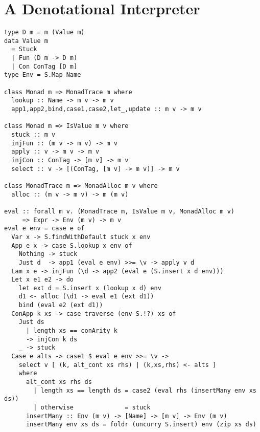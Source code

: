 \section{A Denotational Interpreter}
\label{sec:interp}

\lstset{language=Haskell,style=hsyl}

\begin{lstlisting}
type D m = m (Value m)
data Value m
  = Stuck
  | Fun (D m -> D m)
  | Con ConTag [D m]
type Env = S.Map Name

class Monad m => MonadTrace m where
  lookup :: Name -> m v -> m v
  app1,app2,bind,case1,case2,let_,update :: m v -> m v

class Monad m => IsValue m v where
  stuck :: m v
  injFun :: (m v -> m v) -> m v
  apply :: v -> m v -> m v
  injCon :: ConTag -> [m v] -> m v
  select :: v -> [(ConTag, [m v] -> m v)] -> m v

class MonadTrace m => MonadAlloc m v where
  alloc :: (m v -> m v) -> m (m v)

eval :: forall m v. (MonadTrace m, IsValue m v, MonadAlloc m v)
     => Expr -> Env (m v) -> m v
eval e env = case e of
  Var x -> S.findWithDefault stuck x env
  App e x -> case S.lookup x env of
    Nothing -> stuck
    Just d  -> app1 (eval e env) >>= \v -> apply v d
  Lam x e -> injFun (\d -> app2 (eval e (S.insert x d env)))
  Let x e1 e2 -> do
    let ext d = S.insert x (lookup x d) env
    d1 <- alloc (\d1 -> eval e1 (ext d1))
    bind (eval e2 (ext d1))
  ConApp k xs -> case traverse (env S.!?) xs of
    Just ds
      | length xs == conArity k
      -> injCon k ds
    _ -> stuck
  Case e alts -> case1 $ eval e env >>= \v ->
    select v [ (k, alt_cont xs rhs) | (k,xs,rhs) <- alts ]
    where
      alt_cont xs rhs ds
        | length xs == length ds = case2 (eval rhs (insertMany env xs ds))
        | otherwise              = stuck
      insertMany :: Env (m v) -> [Name] -> [m v] -> Env (m v)
      insertMany env xs ds = foldr (uncurry S.insert) env (zip xs ds)
\end{lstlisting}
